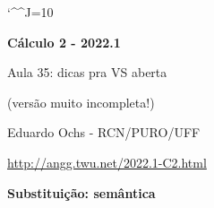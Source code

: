 \documentclass[oneside,12pt]{article}
\begin{document}
\catcode`\^^J=10
\pu
\def\pictgridstyle{\color{GrayPale}\linethickness{0.3pt}}
\def\pictaxesstyle{\linethickness{0.5pt}}
\def\pictnaxesstyle{\color{GrayPale}\linethickness{0.5pt}}
\celllower=2.5pt


\def\u#1{\par{\footnotesize \url{#1}}}

\def\drafturl{http://angg.twu.net/LATEX/2022-1-C2.pdf}
\def\drafturl{http://angg.twu.net/2022.1-C2.html}
\def\draftfooter{\tiny \href{\drafturl}{\jobname{}} \ColorBrown{\shorttoday{} \hours}}



%

\thispagestyle{empty}

\begin{center}

\vspace*{1.2cm}

{\bf \Large Cálculo 2 - 2022.1}

\bsk

Aula 35: dicas pra VS aberta

(versão muito incompleta!)

\bsk

Eduardo Ochs - RCN/PURO/UFF

\url{http://angg.twu.net/2022.1-C2.html}

\end{center}

\newpage


{\bf Substituição: semântica}
\end{document}
